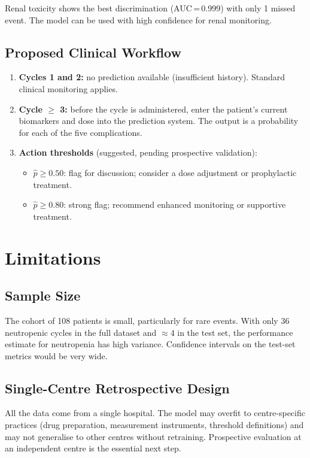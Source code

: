 \documentclass[12pt,a4paper]{report}
\begin{document}
Renal toxicity shows the best discrimination (AUC\,=\,0.999) with only 1 missed event. The model can be used with high confidence for renal monitoring.

\subsection{Proposed Clinical Workflow}

\begin{enumerate}
  \item \textbf{Cycles 1 and 2:} no prediction available (insufficient history). Standard clinical monitoring applies.
  \item \textbf{Cycle $\geq$ 3:} before the cycle is administered, enter the patient's current biomarkers and dose into the prediction system. The output is a probability for each of the five complications.
  \item \textbf{Action thresholds} (suggested, pending prospective validation):
    \begin{itemize}
      \item $\hat{p} \geq 0.50$: flag for discussion; consider a dose adjustment or prophylactic treatment.
      \item $\hat{p} \geq 0.80$: strong flag; recommend enhanced monitoring or supportive treatment.
    \end{itemize}
\end{enumerate}

\section{Limitations}

\subsection{Sample Size}
The cohort of 108 patients is small, particularly for rare events. With only 36 neutropenic cycles in the full dataset and $\approx$4 in the test set, the performance estimate for neutropenia has high variance. Confidence intervals on the test-set metrics would be very wide.

\subsection{Single-Centre Retrospective Design}
All the data come from a single hospital. The model may overfit to centre-specific practices (drug preparation, measurement instruments, threshold definitions) and may not generalise to other centres without retraining. Prospective evaluation at an independent centre is the essential next step.
\end{document}
